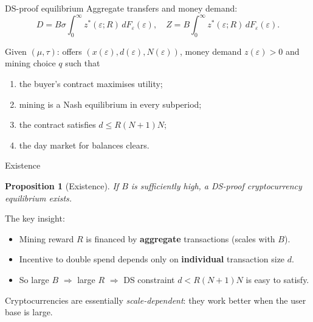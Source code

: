 \documentclass[aspectratio=169,xcolor=dvipsnames]{beamer}
\newtheorem{proposition}{Proposition}
\begin{document}
\begin{frame}{DS-proof equilibrium}
    Aggregate transfers and money demand:
    \[
        D = B\sigma\!\int_0^\infty z^*(\varepsilon;R)\,dF_\varepsilon(\varepsilon),\quad
        Z = B\!\int_0^\infty z^*(\varepsilon;R)\,dF_\varepsilon(\varepsilon). \tag{35,36}
    \]
    \vspace{2mm}
    \begin{definition}
        Given $(\mu,\tau)$: offers $(x(\varepsilon),d(\varepsilon),N(\varepsilon))$, money demand $z(\varepsilon)>0$ and mining choice $q$ such that
        \begin{enumerate}
            \item the buyer's contract maximises utility;
            \item mining is a Nash equilibrium in every subperiod;
            \item the contract satisfies $d \le R(N+1)N$;
            \item the day market for balances clears.
        \end{enumerate}
    \end{definition}
\end{frame}

\begin{frame}{Existence}
    \begin{proposition}[Existence]
        If $B$ is sufficiently high, a DS-proof cryptocurrency equilibrium exists.
    \end{proposition}
    \vspace{3mm}
    The key insight:
    \begin{itemize}
        \item Mining reward $R$ is financed by \textbf{aggregate} transactions
              (scales with $B$).
        \item Incentive to double spend depends only on \textbf{individual} transaction
              size $d$.
        \item So large $B$ $\Rightarrow$ large $R$ $\Rightarrow$ DS constraint $d<R(N+1)N$
              is easy to satisfy.
    \end{itemize}
    \vspace{3mm}
    Cryptocurrencies are essentially \emph{scale-dependent}: they work better when the
    user base is large.
\end{frame}
\end{document}
